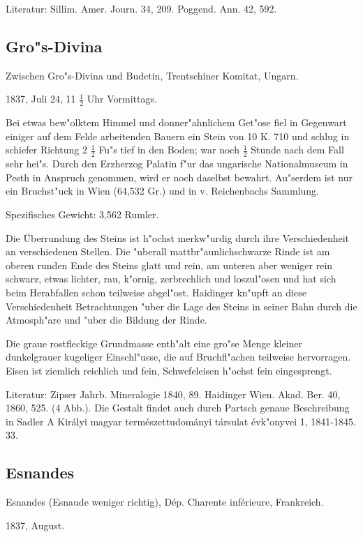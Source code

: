 \documentclass[a4paper, 11pt, oneside]{article}
\begin{document}
Literatur: Sillim. Amer. Journ. 34, 209. Poggend. Ann. 42, 592.

\subsection{Gro"s-Divina}

Zwischen Gro"s-Divina und Budetin, Trentschiner Komitat, Ungarn.

1837, Juli 24, 11 $\frac{1}{2}$ Uhr Vormittags.

Bei etwas bew"olktem Himmel und donner"ahnlichem Get"ose fiel in Gegenwart einiger auf dem Felde arbeitenden Bauern ein Stein von 10 K. 710 und schlug in schiefer Richtung 2 $\frac{1}{2}$ Fu"s tief in den Boden; war noch $\frac{1}{2}$ Stunde nach dem Fall sehr hei"s. Durch den Erzherzog Palatin f"ur das ungarische Nationalmuseum in Pesth in Anspruch genommen, wird er noch daselbst bewahrt. Au"serdem ist nur ein Bruchst"uck in Wien (64,532 Gr.) und in v. Reichenbachs Sammlung.

Spezifisches Gewicht: 3,562 Rumler.

Die Überrundung des Steins ist h"ochst merkw"urdig durch ihre Verschiedenheit an verschiedenen Stellen. Die "uberall mattbr"aunlichschwarze Rinde ist am oberen runden Ende des Steins glatt und rein, am unteren aber weniger rein schwarz, etwas lichter, rau, k"ornig, zerbrechlich und loszul"osen und hat sich beim Herabfallen schon teilweise abgel"ost. Haidinger kn"upft an diese Verschiedenheit Betrachtungen "uber die Lage des Steins in seiner Bahn durch die Atmosph"are und "uber die Bildung der Rinde.

Die graue rostfleckige Grundmasse enth"alt eine gro"se Menge kleiner dunkelgrauer kugeliger Einschl"usse, die auf Bruchfl"achen teilweise hervorragen. Eisen ist ziemlich reichlich und fein, Schwefeleisen h"ochst fein eingesprengt.

Literatur: Zipser Jahrb. Mineralogie 1840, 89. Haidinger Wien. Akad. Ber. 40, 1860, 525. (4 Abb.). Die Gestalt findet auch durch Partsch genaue Beschreibung in Sadler A Királyi magyar természettudományi társulat évk"onyvei 1, 1841-1845. 33.

\subsection{Esnandes}

Esnandes (Esnaude weniger richtig), Dép. Charente inférieure, Frankreich.

1837, August.
\end{document}
